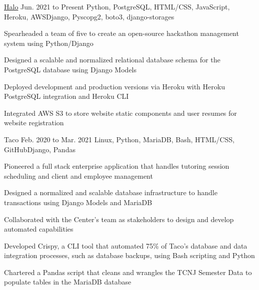 
\begin{cventry}
    {\href{https://github.com/tcnj-acm/halo}{Halo}}{}
    {Jun. 2021 to Present}
    {Python, PostgreSQL, HTML/CSS, JavaScript, Heroku, AWS}{Django, Pyscopg2, boto3, django-storages}
    \begin{cvitems}
        \item Spearheaded a team of five to create an open-source hackathon management system using Python/Django
        \item Designed a scalable and normalized relational database schema for the PostgreSQL database using Django Models
        \item Deployed development and production versions via Heroku with Heroku PostgreSQL integration and Heroku CLI
        \item Integrated AWS S3 to store website static components and user resumes for website registration

    \end{cvitems}
\end{cventry}

 \begin{cventry}
        {Taco}{}
        {Feb. 2020 to Mar. 2021}
        {Linux, Python, MariaDB, Bash, HTML/CSS, GitHub}{Django, Pandas}
        \begin{cvitems}
            \item Pioneered a full stack enterprise application that handles tutoring session scheduling and client and employee management
            \item Designed a normalized and scalable database infrastructure to handle transactions using Django Models and MariaDB
            \item Collaborated with the Center’s team as stakeholders to design and develop automated capabilities 
            \item Developed Crispy, a CLI tool that automated 75\% of Taco's database and data integration processes, such as database backups, using Bash scripting and Python 
            \item Chartered a Pandas script that cleans and wrangles the TCNJ Semester Data to populate tables in the MariaDB database
        \end{cvitems}  
\end{cventry}    

